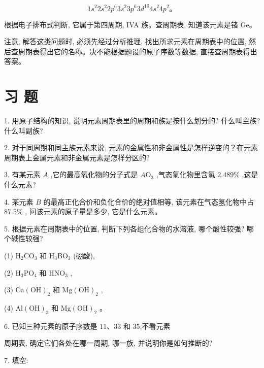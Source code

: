 \documentclass[10pt]{article}
\begin{document}
\[
1{s}^{2}2{s}^{2}2{p}^{6}3{s}^{2}3{p}^{6}3{d}^{10}4{s}^{2}4{p}^{2}\text{。}
\]

根据电子排布式判断, 它属于第四周期, IVA 族。查周期表, 知道该元素是锗 Ge。

注意, 解答这类问题时, 必须先经过分析推理, 找出所求元素在周期表中的位置, 然后查周期表得出它的名称。决不能根据题设的原子序数等数据, 直接查周期表得出答案。

\section*{习 题}

1. 用原子结构的知识, 说明元素周期表里的周期和族是按什么划分的? 什么叫主族? 什么叫副族?

2. 对于同周期和同主族元素来说, 元素的金属性和非金属性是怎样逆变的？在元素周期表上金属元素和非金属元素是怎样分区的?

3. 有某元素 \(A\) ,它的最高氧化物的分子式是 \(A{\mathrm{O}}_{3}\) ,气态氢化物里含氢 \({2.489}\%\) ,这是什么元素?

4. 某元素 \(B\) 的最高正化合价和负化合价的绝对值相等, 该元素在气态氢化物中占 \({87.5}\%\) , 问该元素的原子量是多少, 它是什么元素。

5. 根据元素在周期表中的位置, 判断下列各组化合物的水溶液, 哪个酸性较强? 哪个碱性较强?

(1) \({\mathrm{H}}_{2}{\mathrm{{CO}}}_{3}\) 和 \({\mathrm{H}}_{3}{\mathrm{{BO}}}_{3}\) (硼酸),

(2) \({\mathrm{H}}_{3}{\mathrm{{PO}}}_{4}\) 和 \({\mathrm{{HNO}}}_{3}\) ,

(3) \(\mathrm{{Ca}}{\left( \mathrm{{OH}}\right) }_{2}\) 和 \(\mathrm{{Mg}}{\left( \mathrm{{OH}}\right) }_{2}\) ,

(4) \(\mathrm{{Al}}{\left( \mathrm{{OH}}\right) }_{3}\) 和 \(\mathrm{{Mg}}{\left( \mathrm{{OH}}\right) }_{2}\) 。

6. 已知三种元素的原子序数是 \({11}\text{、}{33}\) 和 35,不看元素

周期表, 确定它们各处在哪一周期, 哪一族, 并说明你是如何推断的?

7. 填空:

\begin{center}
\end{center}
\end{document}
